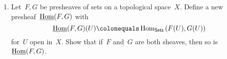 \documentclass[a4paper,11pt,oneside,openany,article]{memoir}
\begin{document}
\begin{enumerate}









  \item Let~$F,G$ be presheaves of sets on a topological space~$X$. Define a new presheaf~$\underline{\operatorname{Hom}}(F,G)$ with
    \begin{equation}
      \uHom(F,G)(U)\colonequals\Hom_{\Sets}\left( F(U),G(U) \right)
    \end{equation}
    for~$U$ open in~$X$. Show that if~$F$ and~$G$ are both sheaves, then so is~$\underline{\operatorname{Hom}}(F,G)$.


\end{enumerate}
\end{document}
